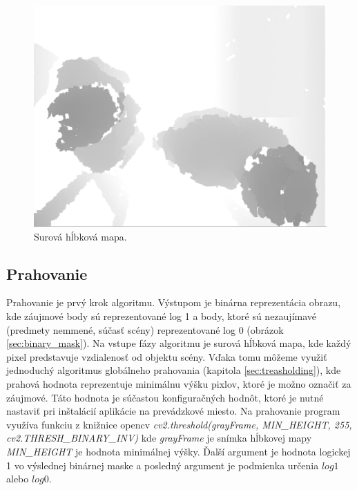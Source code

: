 \begin{figure}[H]
\begin{center}
	\includegraphics[scale=0.30]{images/deepImage}
	\caption{Surová hĺbková mapa.}
	\label{sec:deep_image}
	\end{center}
\end{figure}



\subsection{Prahovanie}
\label{sec:imp_treashold}
Prahovanie je prvý krok algoritmu. Výstupom je binárna reprezentácia obrazu, kde záujmové body sú reprezentované log 1 a body, ktoré sú nezaujímavé (predmety nemmené, súčasť scény) reprezentované log 0 (obrázok \ref{sec:binary_mask}). Na vstupe fázy algoritmu je surová hĺbková mapa, kde každý pixel predstavuje vzdialenosť od objektu scény. Vďaka tomu môžeme využiť jednoduchý algoritmus globálneho prahovania (kapitola \ref{sec:treasholding}), kde prahová hodnota reprezentuje minimálnu výšku pixlov, ktoré je možno označiť za záujmové. Táto hodnota je súčastou konfiguračných hodnôt, ktoré je nutné nastaviť pri inštalácií aplikácie na prevádzkové miesto. Na prahovanie program využíva funkciu z knižnice opencv \textit{cv2.threshold(grayFrame, MIN\_HEIGHT, 255, cv2.THRESH\_BINARY\_INV)} kde \textit{grayFrame} je snímka hĺbkovej mapy \textit{MIN\_HEIGHT} je hodnota minimálnej výšky. Ďalší argument je hodnota logickej 1 vo výslednej binárnej maske a posledný argument je podmienka určenia $log 1$ alebo $log 0$.

